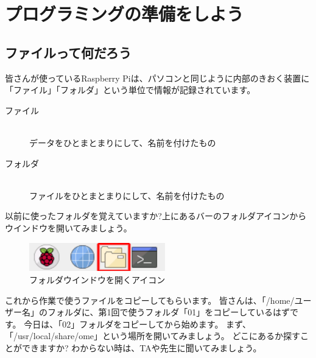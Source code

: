 \clearpage
\section{プログラミングの準備をしよう}
\subsection{ファイルって何だろう}

皆さんが使っているRaspberry Piは、パソコンと同じように内部のきおく装置に
「ファイル」「フォルダ」という単位で情報が記録されています。
\begin{description}
  \item[ファイル]\mbox{}\\
  データをひとまとまりにして、名前を付けたもの
  \item[フォルダ]\mbox{}\\
  ファイルをひとまとまりにして、名前を付けたもの
\end{description}
  

以前に使ったフォルダを覚えていますか?上にあるバーのフォルダアイコンからウインドウを開いてみましょう。

\begin{figure}[H]
  \begin{center}
    \includegraphics[keepaspectratio,width=5.898cm,height=1.242cm]{images/chap02/text02-img001.png}
    \caption{フォルダウインドウを開くアイコン}
  \end{center}
  \label{fig:folder_icon}
\end{figure}

これから作業で使うファイルをコピーしてもらいます。
皆さんは、「/home/ユーザー名」のフォルダに、第1回で使うフォルダ「01」をコピーしているはずです。
今日は、「02」フォルダをコピーしてから始めます。
まず、「/usr/local/share/ome」という場所を開いてみましょう。
どこにあるか探すことができますか?
わからない時は、TAや先生に聞いてみましょう。

